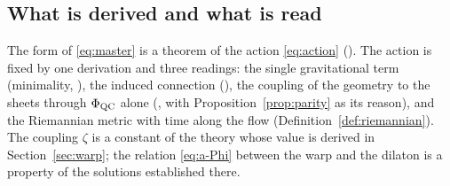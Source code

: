 \subsection{What is derived and what is read}\label{sec:summary3}

The form of \eqref{eq:master} is a theorem of the action \eqref{eq:action}
(\rigR). The action is fixed by one derivation and three readings: the
single gravitational term (minimality, \rigD), the induced connection
(\rigD), the coupling of the geometry to the sheets through $\Phi_{\mathrm{QC}}$ alone
(\rigD, with Proposition~\ref{prop:parity} as its reason), and the
Riemannian metric with time along the flow (Definition~\ref{def:riemannian}).
The coupling $\zeta$ is a constant of the theory whose value is derived in
Section~\ref{sec:warp}; the relation \eqref{eq:a-Phi} between the warp and the dilaton
is a property of the solutions established there.

